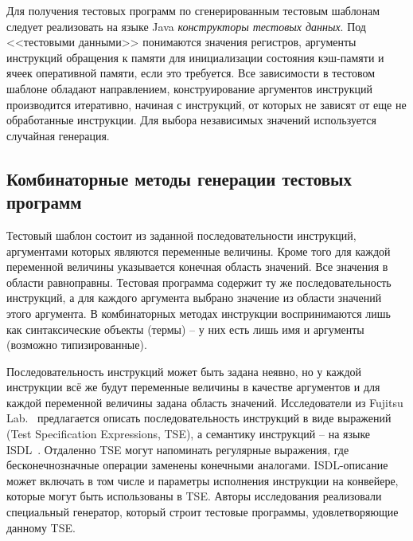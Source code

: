 Для получения тестовых программ по сгенерированным тестовым шаблонам
следует реализовать на языке Java \emph{конструкторы тестовых
данных}. Под <<тестовыми данными>> понимаются значения регистров,
аргументы инструкций обращения к памяти для инициализации состояния
кэш-памяти и ячеек оперативной памяти, если это требуется. Все
зависимости в тестовом шаблоне обладают направлением,
конструирование аргументов инструкций производится итеративно,
начиная с инструкций, от которых не зависят от еще не обработанные
инструкции. Для выбора независимых значений используется случайная
генерация.


\subsection{Комбинаторные методы генерации тестовых программ}

Тестовый шаблон состоит из заданной последовательности инструкций,
аргументами которых являются переменные величины. Кроме того для
каждой переменной величины указывается конечная область значений.
Все значения в области равноправны. Тестовая программа содержит ту
же последовательность инструкций, а для каждого аргумента выбрано
значение из области значений этого аргумента. В комбинаторных
методах инструкции воспринимаются лишь как синтаксические объекты
(термы) -- у них есть лишь имя и аргументы (возможно
типизированные).

Последовательность инструкций может быть задана неявно, но у каждой
инструкции всё же будут переменные величины в качестве аргументов и
для каждой переменной величины задана область значений.
Исследователи из Fujitsu Lab.~\cite{TSE} предлагается описать
последовательность инструкций в виде выражений (Test Specification
Expressions, TSE), а семантику инструкций -- на языке
ISDL~\cite{ISDL}. Отдаленно TSE могут напоминать регулярные
выражения, где бесконечнозначные операции заменены конечными
аналогами. ISDL-описание может включать в том числе и параметры
исполнения инструкции на конвейере, которые могут быть использованы
в TSE. Авторы исследования реализовали специальный генератор,
который строит тестовые программы, удовлетворяющие данному TSE.

